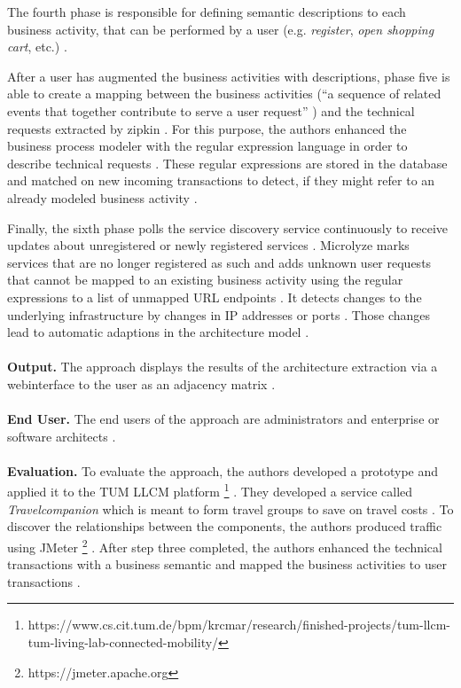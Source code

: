 The fourth phase is responsible for defining semantic descriptions to each business activity, that can be performed by a user (e.g. \textit{register}, \textit{open shopping cart}, etc.) \cite{Kleehaus2018}.

After a user has augmented the business activities with descriptions, phase five is able to create a mapping between the business activities (``a sequence of related events that together contribute to serve a user request'' \cite{Kleehaus2018}) and the technical requests extracted by zipkin \cite{Kleehaus2018}.
For this purpose, the authors enhanced the business process modeler with the regular expression language in order to describe technical requests \cite{Kleehaus2018}.
These regular expressions are stored in the database and matched on new incoming transactions to detect, if they might refer to an already modeled business activity \cite{Kleehaus2018}.

Finally, the sixth phase polls the service discovery service continuously to receive updates about unregistered or newly registered services \cite{Kleehaus2018}.
Microlyze marks services that are no longer registered as such and adds unknown user requests that cannot be mapped to an existing business activity using the regular expressions to a list of unmapped URL endpoints \cite{Kleehaus2018}.
It detects changes to the underlying infrastructure by changes in IP addresses or ports \cite{Kleehaus2018}.
Those changes lead to automatic adaptions in the architecture model \cite{Kleehaus2018}.
\\ \\
\textbf{Output.}
The approach displays the results of the architecture extraction via a webinterface to the user as an adjacency matrix \cite{Kleehaus2018}.
\\ \\
\textbf{End User.}
The end users of the approach are administrators and enterprise or software architects \cite{Kleehaus2018}.
\\ \\
\textbf{Evaluation.}
To evaluate the approach, the authors developed a prototype and applied it to the TUM LLCM platform \footnote{https://www.cs.cit.tum.de/bpm/krcmar/research/finished-projects/tum-llcm-tum-living-lab-connected-mobility/} \cite{Kleehaus2018}.
They developed a service called \textit{Travelcompanion} which is meant to form travel groups to save on travel costs \cite{Kleehaus2018}.
To discover the relationships between the components, the authors produced traffic using JMeter \footnote{https://jmeter.apache.org} \cite{Kleehaus2018}.
After step three completed, the authors enhanced the technical transactions with a business semantic and mapped the business activities to user transactions \cite{Kleehaus2018}.

